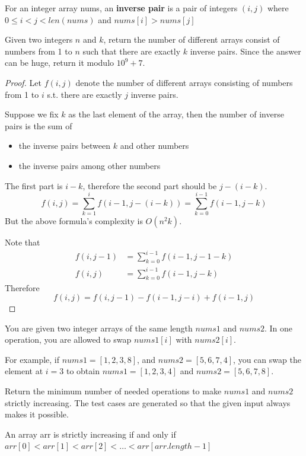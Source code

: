 \documentclass[11pt]{article}
\begin{document}
\begin{problem}
For an integer array nums, an \textbf{inverse pair} is a pair of integers \((i,j)\)
where \(0\le i<j<len(nums)\) and \(nums[i]>nums[j]\)

Given two integers \(n\) and \(k\), return the number of different arrays consist of numbers
from 1 to \(n\) such that there are exactly \(k\) inverse pairs. Since the answer can be huge,
return it modulo \(10^9+7\).
\end{problem}

\begin{proof}
Let \(f(i,j)\) denote the number of different arrays consisting of numbers from 1 to \(i\) s.t.
there are exactly \(j\) inverse pairs.

Suppose we fix \(k\) as the last element of the array, then the number of inverse pairs is the sum of
\begin{itemize}
\item the inverse pairs between \(k\) and other numbers
\item the inverse pairs among other numbers
\end{itemize}

The first part is \(i-k\), therefore the second part should be \(j-(i-k)\).
\begin{equation*}
f(i,j)=\sum_{k=1}^if(i-1,j-(i-k))=\sum_{k=0}^{i-1}f(i-1,j-k)
\end{equation*}
But the above formula's complexity is \(O(n^2k)\).

Note that
\begin{align*}
f(i,j-1)&=\sum_{k=0}^{i-1}f(i-1,j-1-k)\\
f(i,j)&=\sum_{k=0}^{i-1}f(i-1,j-k)
\end{align*}
Therefore
\begin{equation*}
f(i,j)=f(i,j-1)-f(i-1,j-i)+f(i-1,j)
\end{equation*}
\end{proof}

\begin{problem}
You are given two integer arrays of the same length \(nums1\) and \(nums2\). In one operation, you are
allowed to swap \(nums1[i]\) with \(nums2[i]\).

For example, if \(nums1 = [1,2,3,8]\), and \(nums2 = [5,6,7,4]\), you can swap the element at \(i = 3\) to
obtain \(nums1 = [1,2,3,4]\) and \(nums2 = [5,6,7,8]\).

Return the minimum number of needed operations to make \(nums1\) and \(nums2\) strictly increasing. The
test cases are generated so that the given input always makes it possible.

An array arr is strictly increasing if and only if \(arr[0] < arr[1] < arr[2] <\dots < arr[arr.length - 1]\)
\end{problem}
\end{document}
